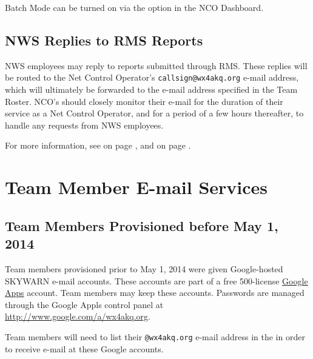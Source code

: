 \documentclass[pdflatex,letterpaper,twoside,12pt]{book}
\begin{document}
Batch Mode can be turned on via the  option in the NCO Dashboard.


\section{NWS Replies to RMS Reports}\label{nws-replies}

NWS employees may reply to reports submitted through RMS.  These replies will be routed to the Net Control Operator's \texttt{callsign@wx4akq.org} e-mail address, which will ultimately be forwarded to the e-mail address specified in the Team Roster.  NCO's should closely monitor their e-mail for the duration of their service as a Net Control Operator, and for a period of a few hours thereafter, to handle any requests from NWS employees.

For more information, see  on page \pageref{team-roster}, and  on page \pageref{team-email}.


\chapter{Team Member E-mail Services}\label{team-email}

\section{Team Members Provisioned before May 1, 2014}

Team members provisioned prior to May 1, 2014 were given Google-hosted SKYWARN e-mail accounts.  These accounts are part of a free 500-license \href{http://www.google.com/a}{Google Apps} account.  Team members may keep these accounts.  Passwords are managed through the Google Appls control panel at \href{http://www.google.com/a/wx4akq.org}{http://www.google.com/a/wx4akq.org}.

Team members will need to list their \texttt{@wx4akq.org} e-mail address in the  in order to receive e-mail at these Google accounts.
\end{document}
